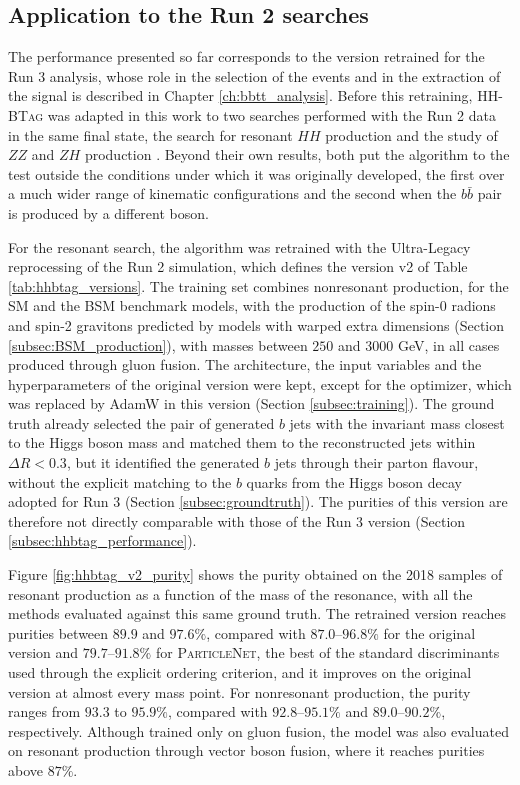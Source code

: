 \subsection{Application to the Run 2 searches}
\label{subsec:hhbtag_run2}
%
The performance presented so far corresponds to the version retrained for the Run 3 analysis, whose role in the selection of the events and in the extraction of the signal is described in Chapter \ref{ch:bbtt_analysis}. Before this retraining, \textsc{HH-BTag} was adapted in this work to two searches performed with the Run 2 data in the same final state, the search for resonant $HH$ production \cite{CMS-PAS-B2G-24-011} and the study of $ZZ$ and $ZH$ production \cite{CMS:2026zzzh}. Beyond their own results, both put the algorithm to the test outside the conditions under which it was originally developed, the first over a much wider range of kinematic configurations and the second when the $b\bar{b}$ pair is produced by a different boson.\medskip

For the resonant search, the algorithm was retrained with the Ultra-Legacy reprocessing of the Run 2 simulation, which defines the version v2 of Table \ref{tab:hhbtag_versions}. The training set combines nonresonant production, for the SM and the BSM benchmark models, with the production of the spin-0 radions and spin-2 gravitons predicted by models with warped extra dimensions (Section \ref{subsec:BSM_production}), with masses between $250$ and $3000$ GeV, in all cases produced through gluon fusion. The architecture, the input variables and the hyperparameters of the original version were kept, except for the optimizer, which was replaced by AdamW in this version (Section \ref{subsec:training}). The ground truth already selected the pair of generated $b$ jets with the invariant mass closest to the Higgs boson mass and matched them to the reconstructed jets within $\Delta R < 0.3$, but it identified the generated $b$ jets through their parton flavour, without the explicit matching to the $b$ quarks from the Higgs boson decay adopted for Run 3 (Section \ref{subsec:groundtruth}). The purities of this version are therefore not directly comparable with those of the Run 3 version (Section \ref{subsec:hhbtag_performance}). 

Figure \ref{fig:hhbtag_v2_purity} shows the purity obtained on the 2018 samples of resonant production as a function of the mass of the resonance, with all the methods evaluated against this same ground truth. The retrained version reaches purities between $89.9$ and $97.6\%$, compared with $87.0$--$96.8\%$ for the original version and $79.7$--$91.8\%$ for \textsc{ParticleNet}, the best of the standard discriminants used through the explicit ordering criterion, and it improves on the original version at almost every mass point. For nonresonant production, the purity ranges from $93.3$ to $95.9\%$, compared with $92.8$--$95.1\%$ and $89.0$--$90.2\%$, respectively. Although trained only on gluon fusion, the model was also evaluated on resonant production through vector boson fusion, where it reaches purities above $87\%$.


